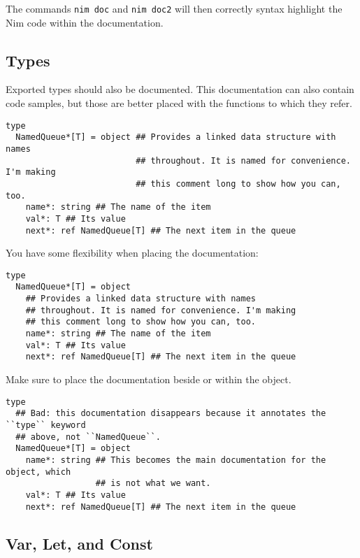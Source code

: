 The commands \texttt{nim\ doc} and \texttt{nim\ doc2} will then
correctly syntax highlight the Nim code within the documentation.

\hypertarget{types}{%
\subsection{Types}\label{types}}

Exported types should also be documented. This documentation can also
contain code samples, but those are better placed with the functions to
which they refer.

\begin{verbatim}
type
  NamedQueue*[T] = object ## Provides a linked data structure with names
                          ## throughout. It is named for convenience. I'm making
                          ## this comment long to show how you can, too.
    name*: string ## The name of the item
    val*: T ## Its value
    next*: ref NamedQueue[T] ## The next item in the queue
\end{verbatim}

You have some flexibility when placing the documentation:

\begin{verbatim}
type
  NamedQueue*[T] = object
    ## Provides a linked data structure with names
    ## throughout. It is named for convenience. I'm making
    ## this comment long to show how you can, too.
    name*: string ## The name of the item
    val*: T ## Its value
    next*: ref NamedQueue[T] ## The next item in the queue
\end{verbatim}

Make sure to place the documentation beside or within the object.

\begin{verbatim}
type
  ## Bad: this documentation disappears because it annotates the ``type`` keyword
  ## above, not ``NamedQueue``.
  NamedQueue*[T] = object
    name*: string ## This becomes the main documentation for the object, which
                  ## is not what we want.
    val*: T ## Its value
    next*: ref NamedQueue[T] ## The next item in the queue
\end{verbatim}

\hypertarget{var-let-and-const}{%
\subsection{Var, Let, and Const}\label{var-let-and-const}}

